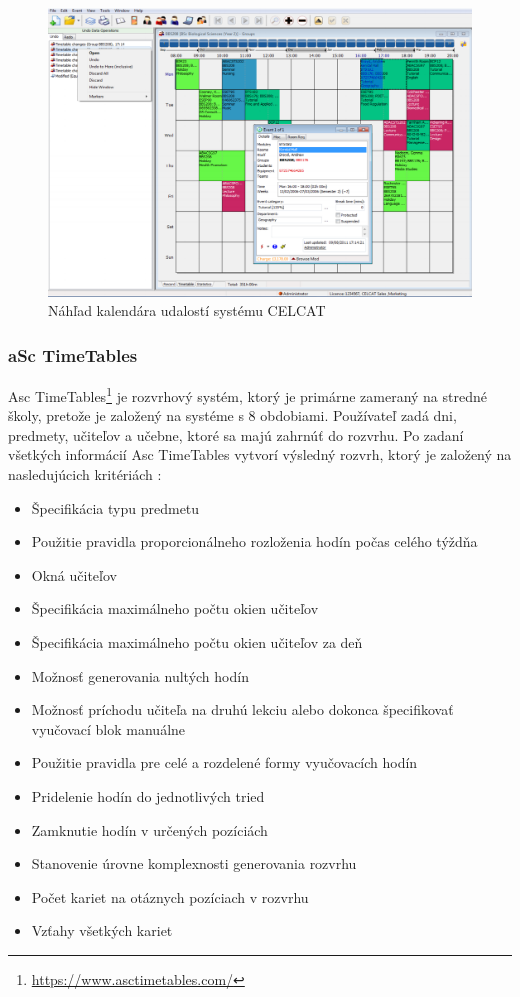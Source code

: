 \begin{figure}[ht]
  \centering
  \includegraphics[width=0.71\columnwidth]{img/celcat2.jpg}
  \caption{\label{fig:celcat2_gui} Náhľad kalendára udalostí systému CELCAT \cite{celcat}}
\end{figure}

\subsubsection{aSc TimeTables}
\label{subsubsec:asc}

Asc TimeTables\footnote{\url{https://www.asctimetables.com/}} je rozvrhový systém,
ktorý je primárne zameraný na stredné školy, pretože je založený na systéme s 8 obdobiami.
Používateľ zadá dni, predmety, učiteľov a učebne, ktoré sa majú zahrnúť do rozvrhu. Po zadaní
všetkých informácií Asc TimeTables vytvorí výsledný rozvrh, ktorý je založený na nasledujúcich kritériách \cite{asc}:

\begin{itemize}
\item Špecifikácia typu predmetu
\item Použitie pravidla proporcionálneho rozloženia hodín počas celého týždňa
\item Okná učiteľov
\item Špecifikácia maximálneho počtu okien učiteľov
\item Špecifikácia maximálneho počtu okien učiteľov za deň
\item Možnosť generovania nultých hodín
\item Možnosť príchodu učiteľa na druhú lekciu alebo dokonca špecifikovať vyučovací blok manuálne
\item Použitie pravidla pre celé a rozdelené formy vyučovacích hodín
\item Pridelenie hodín do jednotlivých tried
\item Zamknutie hodín v určených pozíciách
\item Stanovenie úrovne komplexnosti generovania rozvrhu
\item Počet kariet na otáznych pozíciach v rozvrhu
\item Vzťahy všetkých kariet
\end{itemize}


